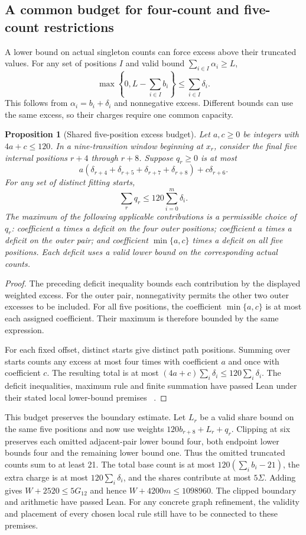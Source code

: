 \documentclass[11pt,a4paper]{article}
\newtheorem{proposition}[theorem]{Proposition}
\theoremstyle{definition}
\theoremstyle{remark}
\begin{document}
\subsection{A common budget for four-count and five-count restrictions}\label{sec:four-five-budget}
A lower bound on actual singleton counts can force excess above their
truncated values. For any set of positions $I$ and valid bound
$\sum_{i\in I}\alpha_i\ge L$,
\[
\max\left\{0,L-\sum_{i\in I}b_i\right\}
\le\sum_{i\in I}\delta_i.
\]
This follows from $\alpha_i=b_i+\delta_i$ and nonnegative excess.
Different bounds can use the same excess, so their charges require one
common capacity.

\begin{proposition}[Shared five-position excess budget]\label{prop:four-five-budget}
Let $a,c\ge0$ be integers with $4a+c\le120$. In a nine-transition window
beginning at $x_r$, consider the final five internal positions $r+4$ through
$r+8$. Suppose $q_r\ge0$ is at most
\[
a(\delta_{r+4}+\delta_{r+5}+\delta_{r+7}+\delta_{r+8})
+c\delta_{r+6}.
\]
For any set of distinct fitting starts,
\[
\sum_r q_r\le120\sum_{i=0}^{m}\delta_i.
\]
The maximum of the following applicable contributions is a permissible
choice of $q_r$: coefficient $a$ times a deficit on the four outer
positions; coefficient $a$ times a deficit on the outer pair; and
coefficient $\min\{a,c\}$ times a deficit on all five positions.
Each deficit uses a valid lower bound on the corresponding actual counts.
\end{proposition}
\begin{proof}
The preceding deficit inequality bounds each contribution by the displayed
weighted excess. For the outer pair, nonnegativity permits the other two
outer excesses to be included. For all five positions, the coefficient
$\min\{a,c\}$ is at most each assigned coefficient. Their maximum is
therefore bounded by the same expression.

For each fixed offset, distinct starts give distinct path positions.
Summing over starts counts any excess at most four times with coefficient
$a$ and once with coefficient $c$. The resulting total is at most
$(4a+c)\sum_i\delta_i\le120\sum_i\delta_i$.
The deficit inequalities, maximum rule and finite summation have passed
Lean under their stated local lower-bound premises
~\cite{sumbudgetarchive,pairbudgetarchive}.
\end{proof}

This budget preserves the boundary estimate. Let $L_r$ be a valid share
bound on the same five positions and now use weights
$120b_{r+8}+L_r+q_r$. Clipping at six preserves each omitted adjacent-pair
lower bound four, both endpoint lower bounds four and the remaining lower
bound one. Thus the omitted truncated counts sum to at least 21. The total
base count is at most $120(\sum_i b_i-21)$, the extra charge is at most
$120\sum_i\delta_i$, and the shares contribute at most $5\Sigma$.
Adding gives $W+2520\le5G_{12}$ and hence $W+4200m\le1098960$.
The clipped boundary and arithmetic have passed Lean. For any concrete
graph refinement, the validity and placement of every chosen local rule
still have to be connected to these premises.
\end{document}
